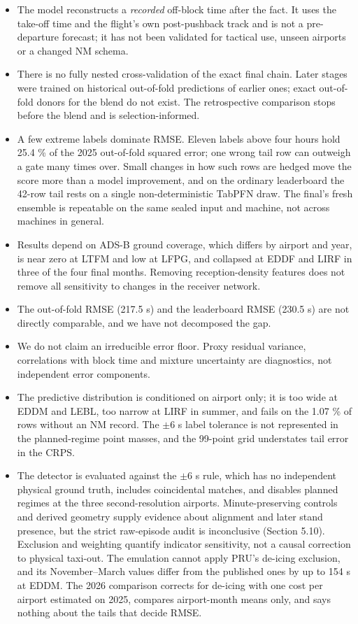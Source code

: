 \documentclass[11pt,a4paper]{article}
\providecommand{\tightlist}{\setlength{\itemsep}{0pt}\setlength{\parskip}{0pt}}
\begin{document}
\begin{itemize}
\tightlist
\item
  The model reconstructs a \emph{recorded} off-block time after the fact. It uses the take-off time and the flight's own post-pushback track and is not a pre-departure forecast; it has not been validated for tactical use, unseen airports or a changed NM schema.
\item
  There is no fully nested cross-validation of the exact final chain. Later stages were trained on historical out-of-fold predictions of earlier ones; exact out-of-fold donors for the blend do not exist. The retrospective comparison stops before the blend and is selection-informed.
\item
  A few extreme labels dominate RMSE. Eleven labels above four hours hold 25.4 \% of the 2025 out-of-fold squared error; one wrong tail row can outweigh a gate many times over. Small changes in how such rows are hedged move the score more than a model improvement, and on the ordinary leaderboard the 42-row tail rests on a single non-deterministic TabPFN draw. The final's fresh ensemble is repeatable on the same sealed input and machine, not across machines in general.
\item
  Results depend on ADS-B ground coverage, which differs by airport and year, is near zero at LTFM and low at LFPG, and collapsed at EDDF and LIRF in three of the four final months. Removing reception-density features does not remove all sensitivity to changes in the receiver network.
\item
  The out-of-fold RMSE (217.5 s) and the leaderboard RMSE (230.5 s) are not directly comparable, and we have not decomposed the gap.
\item
  We do not claim an irreducible error floor. Proxy residual variance, correlations with block time and mixture uncertainty are diagnostics, not independent error components.
\item
  The predictive distribution is conditioned on airport only; it is too wide at EDDM and LEBL, too narrow at LIRF in summer, and fails on the 1.07 \% of rows without an NM record. The $\pm$6 s label tolerance is not represented in the planned-regime point masses, and the 99-point grid understates tail error in the CRPS.
\item
  The detector is evaluated against the $\pm$6 s rule, which has no independent physical ground truth, includes coincidental matches, and disables planned regimes at the three second-resolution airports. Minute-preserving controls and derived geometry supply evidence about alignment and later stand presence, but the strict raw-episode audit is inconclusive (Section 5.10). Exclusion and weighting quantify indicator sensitivity, not a causal correction to physical taxi-out. The emulation cannot apply PRU's de-icing exclusion, and its November--March values differ from the published ones by up to 154 s at EDDM. The 2026 comparison corrects for de-icing with one cost per airport estimated on 2025, compares airport-month means only, and says nothing about the tails that decide RMSE.

\end{itemize}
\end{document}
